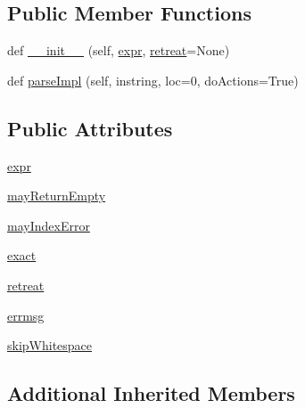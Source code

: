 \subsection*{Public Member Functions}
\begin{DoxyCompactItemize}
\item 
def \hyperlink{classpyparsing_1_1PrecededBy_a236f6533125a3d3188781765f81fa18f}{\+\_\+\+\_\+init\+\_\+\+\_\+} (self, \hyperlink{classpyparsing_1_1PrecededBy_a00f285bb36bee533657365a1fa08217b}{expr}, \hyperlink{classpyparsing_1_1PrecededBy_ae459c75d2665751f167b6108f52e6133}{retreat}=None)
\item 
def \hyperlink{classpyparsing_1_1PrecededBy_a90cdf1792c5a9c8065f5b18d6a6f8369}{parse\+Impl} (self, instring, loc=0, do\+Actions=True)
\end{DoxyCompactItemize}
\subsection*{Public Attributes}
\begin{DoxyCompactItemize}
\item 
\hyperlink{classpyparsing_1_1PrecededBy_a00f285bb36bee533657365a1fa08217b}{expr}
\item 
\hyperlink{classpyparsing_1_1PrecededBy_a07747a577978047fd1c26db25c8c9361}{may\+Return\+Empty}
\item 
\hyperlink{classpyparsing_1_1PrecededBy_a23cd7d97524867e9fd771bbce232ed4e}{may\+Index\+Error}
\item 
\hyperlink{classpyparsing_1_1PrecededBy_a2e9778affc1ade2830c341c143002056}{exact}
\item 
\hyperlink{classpyparsing_1_1PrecededBy_ae459c75d2665751f167b6108f52e6133}{retreat}
\item 
\hyperlink{classpyparsing_1_1PrecededBy_a13fa1a8bf71a4c407a413f978097a670}{errmsg}
\item 
\hyperlink{classpyparsing_1_1PrecededBy_ad055a25db4c390dedef38a28649e5bae}{skip\+Whitespace}
\end{DoxyCompactItemize}
\subsection*{Additional Inherited Members}


